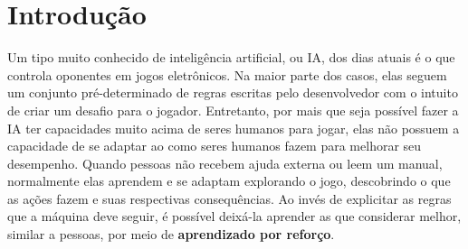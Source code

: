 
\chapter{Introdução}
\label{cap:introducao}


Um tipo muito conhecido de inteligência artificial, ou IA, dos dias atuais é o que controla oponentes em jogos eletrônicos.
Na maior parte dos casos, elas seguem um conjunto pré-determinado de regras escritas pelo desenvolvedor com o intuito de criar um desafio para o jogador.
Entretanto, por mais que seja possível fazer a IA ter capacidades muito acima de seres humanos para jogar, elas não possuem a capacidade de se adaptar ao como seres humanos fazem para melhorar seu desempenho.
Quando pessoas não recebem ajuda externa ou leem um manual, normalmente elas aprendem e se adaptam explorando o jogo, descobrindo o que as ações fazem e suas respectivas consequências.
Ao invés de explicitar as regras que a máquina deve seguir, é possível deixá-la aprender as que considerar melhor, similar a pessoas, por meio de \textbf{aprendizado por reforço}.


